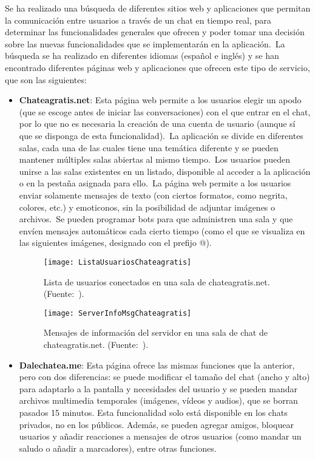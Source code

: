
Se ha realizado una búsqueda de diferentes sitios web y aplicaciones que permitan la comunicación entre usuarios a
través de un chat en tiempo real, para determinar las funcionalidades generales que ofrecen y poder tomar una decisión
sobre las nuevas funcionalidades que se implementarán en la aplicación.\ La búsqueda se ha realizado en diferentes
idiomas (español e inglés) y se han encontrado diferentes páginas web y aplicaciones que ofrecen este tipo de
servicio, que son las siguientes:

\begin{itemize}
	\item \textbf{Chateagratis.net}: Esta página web permite a los usuarios elegir un apodo (que se escoge antes de
	iniciar las conversaciones) con el que entrar en el chat, por lo que no es necesaria la creación de una cuenta de
	usuario (aunque sí que se disponga de esta funcionalidad).\ La aplicación se divide en diferentes salas, cada una
	de las cuales tiene una temática diferente y se pueden mantener múltiples salas abiertas al mismo tiempo.\ Los
	usuarios pueden unirse a las salas existentes en un listado, disponible al acceder a la aplicación o en la pestaña
	asignada para ello.\ La página web permite a los usuarios enviar solamente mensajes de texto (con ciertos
	formatos, como negrita, colores, etc.) y emoticonos, sin la posibilidad de adjuntar imágenes o archivos.\ Se pueden
	programar bots para que administren una sala y que envíen mensajes automáticos cada cierto tiempo (como el que
	se visualiza en las siguientes imágenes, designado con el prefijo @).

	\begin{figure}[H]
		\centering
		\texttt{[image: ListaUsuariosChateagratis]}
		\caption{Lista de usuarios conectados en una sala de chateagratis.net. (Fuente:~\cite{chateagratis:online}).}
		\label{fig:ListaUsuariosChateagratis}
	\end{figure}

	\begin{figure}[H]
		\centering
		\texttt{[image: ServerInfoMsgChateagratis]}
		\caption{Mensajes de información del servidor en una sala de chat de chateagratis.net.
			(Fuente:~\cite{chateagratis:online}).}
		\label{fig:ServerInfoMsgChateagratis}
	\end{figure}

	\item \textbf{Dalechatea.me}: Esta página ofrece las mismas funciones que la anterior, pero con dos diferencias: se
	puede modificar el tamaño del chat (ancho y alto) para adaptarlo a la pantalla y necesidades del usuario y se
	pueden mandar archivos multimedia temporales (imágenes, vídeos y audios), que se borran pasados 15 minutos.
	Esta funcionalidad solo está disponible en los chats privados, no en los públicos.
	Además, se pueden agregar amigos, bloquear usuarios y añadir reacciones a mensajes de otros usuarios (como mandar
	un saludo o añadir a marcadores), entre otras funciones.


\end{itemize}
